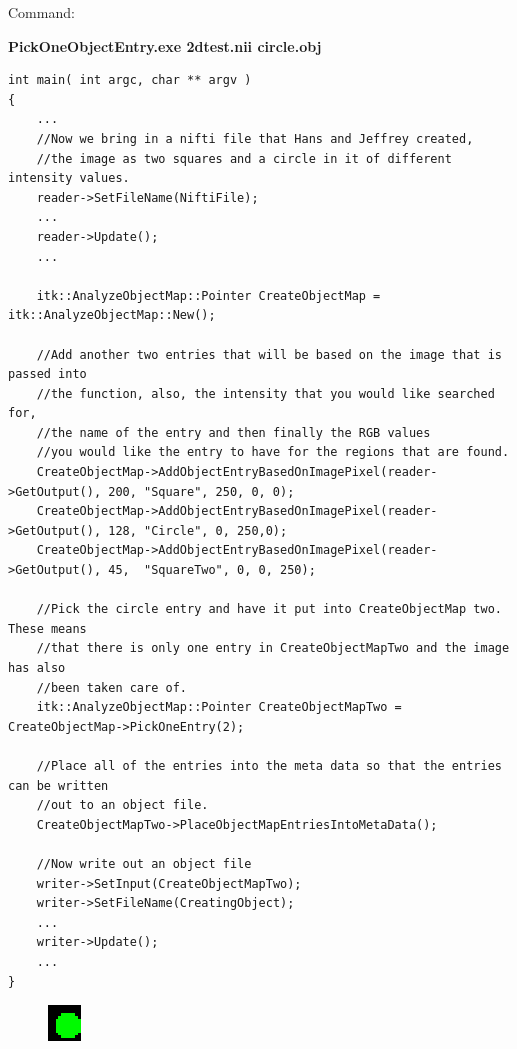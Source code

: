 \documentclass{InsightArticle}
\begin{document}
\begin{itemize}
Command:

\textbf{PickOneObjectEntry.exe 2dtest.nii circle.obj}

\small \begin{verbatim}
int main( int argc, char ** argv )
{
	...
	//Now we bring in a nifti file that Hans and Jeffrey created, 
	//the image as two squares and a circle in it of different intensity values.
	reader->SetFileName(NiftiFile);
	...
	reader->Update();
	...
	
	itk::AnalyzeObjectMap::Pointer CreateObjectMap = itk::AnalyzeObjectMap::New();
	
	//Add another two entries that will be based on the image that is passed into 
	//the function, also, the intensity that you would like searched for, 
	//the name of the entry and then finally the RGB values
	//you would like the entry to have for the regions that are found.
	CreateObjectMap->AddObjectEntryBasedOnImagePixel(reader->GetOutput(), 200, "Square", 250, 0, 0);
	CreateObjectMap->AddObjectEntryBasedOnImagePixel(reader->GetOutput(), 128, "Circle", 0, 250,0);
	CreateObjectMap->AddObjectEntryBasedOnImagePixel(reader->GetOutput(), 45,  "SquareTwo", 0, 0, 250);
	
	//Pick the circle entry and have it put into CreateObjectMap two.  These means
	//that there is only one entry in CreateObjectMapTwo and the image has also
	//been taken care of.
	itk::AnalyzeObjectMap::Pointer CreateObjectMapTwo = CreateObjectMap->PickOneEntry(2);
	
	//Place all of the entries into the meta data so that the entries can be written
	//out to an object file.
	CreateObjectMapTwo->PlaceObjectMapEntriesIntoMetaData();
	
	//Now write out an object file
	writer->SetInput(CreateObjectMapTwo);
	writer->SetFileName(CreatingObject);
	...
	writer->Update();
	...
}
\end{verbatim} \normalsize

\begin{figure}[h]
\center
\includegraphics[width=.14\textwidth]{circle.eps}
\label{fig:StreamingConceptDiagram}
\end{figure}


\end{itemize}
\end{document}
